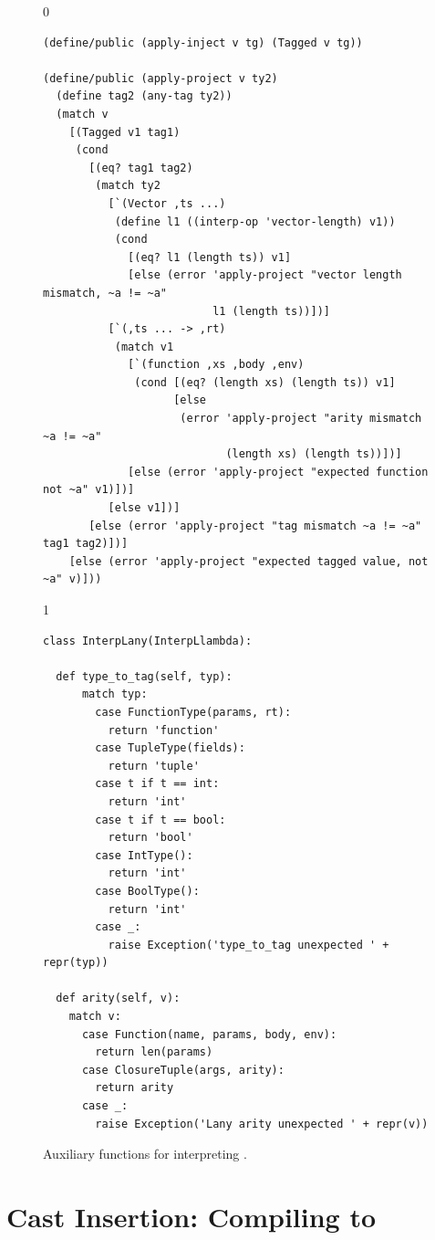 \documentclass[7x10,nocrop]{TimesAPriori_MIT}%
\def\racketEd{0}
\def\pythonEd{1}
\def\edition{0}
\begin{document}
\begin{figure}[tbp]
{\if\edition\racketEd
\begin{lstlisting}
(define/public (apply-inject v tg) (Tagged v tg))

(define/public (apply-project v ty2)
  (define tag2 (any-tag ty2))
  (match v
    [(Tagged v1 tag1)
     (cond
       [(eq? tag1 tag2)
        (match ty2
          [`(Vector ,ts ...)
           (define l1 ((interp-op 'vector-length) v1))
           (cond
             [(eq? l1 (length ts)) v1]
             [else (error 'apply-project "vector length mismatch, ~a != ~a"
                          l1 (length ts))])]
          [`(,ts ... -> ,rt)
           (match v1
             [`(function ,xs ,body ,env)
              (cond [(eq? (length xs) (length ts)) v1]
                    [else
                     (error 'apply-project "arity mismatch ~a != ~a"
                            (length xs) (length ts))])]
             [else (error 'apply-project "expected function not ~a" v1)])]
          [else v1])]
       [else (error 'apply-project "tag mismatch ~a != ~a" tag1 tag2)])]
    [else (error 'apply-project "expected tagged value, not ~a" v)]))
\end{lstlisting}
\fi}
{\if\edition\pythonEd
\begin{lstlisting}
class InterpLany(InterpLlambda):

  def type_to_tag(self, typ):
      match typ:
        case FunctionType(params, rt):
          return 'function'
        case TupleType(fields):
          return 'tuple'
        case t if t == int:
          return 'int'
        case t if t == bool:
          return 'bool'
        case IntType():
          return 'int'
        case BoolType():
          return 'int'
        case _:
          raise Exception('type_to_tag unexpected ' + repr(typ))

  def arity(self, v):
    match v:
      case Function(name, params, body, env):
        return len(params)
      case ClosureTuple(args, arity):
        return arity
      case _:
        raise Exception('Lany arity unexpected ' + repr(v))
\end{lstlisting}
\fi}
  \caption{Auxiliary functions for interpreting \LangAny{}.}
  \label{fig:interp-Rany-aux}
\end{figure}

\clearpage

\section{Cast Insertion: Compiling \LangDyn{} to \LangAny{}}
\label{sec:compile-r7}
\end{document}
